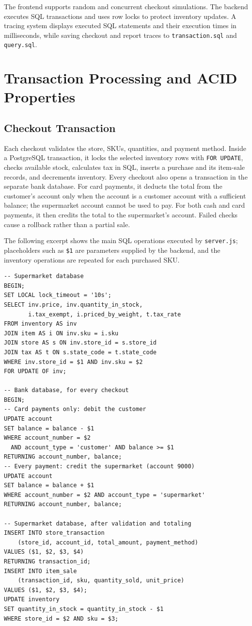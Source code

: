 \documentclass[11pt,letterpaper]{article}
\begin{document}
The frontend supports random and concurrent checkout simulations. The backend executes SQL transactions and uses row locks to protect inventory updates. A tracing system displays executed SQL statements and their execution times in milliseconds, while saving checkout and report traces to \texttt{transaction.sql} and \texttt{query.sql}.


\section{Transaction Processing and ACID Properties}

\subsection{Checkout Transaction}

Each checkout validates the store, SKUs, quantities, and payment method. Inside a PostgreSQL transaction, it locks the selected inventory rows with \texttt{FOR UPDATE}, checks available stock, calculates tax in SQL, inserts a purchase and its item-sale records, and decrements inventory. Every checkout also opens a transaction in the separate bank database. For card payments, it deducts the total from the customer's account only when the account is a customer account with a sufficient balance; the supermarket account cannot be used to pay. For both cash and card payments, it then credits the total to the supermarket's account. Failed checks cause a rollback rather than a partial sale.

The following excerpt shows the main SQL operations executed by \texttt{server.js}; placeholders such as \texttt{\$1} are parameters supplied by the backend, and the inventory operations are repeated for each purchased SKU.

\begin{lstlisting}
-- Supermarket database
BEGIN;
SET LOCAL lock_timeout = '10s';
SELECT inv.price, inv.quantity_in_stock,
       i.tax_exempt, i.priced_by_weight, t.tax_rate
FROM inventory AS inv
JOIN item AS i ON inv.sku = i.sku
JOIN store AS s ON inv.store_id = s.store_id
JOIN tax AS t ON s.state_code = t.state_code
WHERE inv.store_id = $1 AND inv.sku = $2
FOR UPDATE OF inv;

-- Bank database, for every checkout
BEGIN;
-- Card payments only: debit the customer
UPDATE account
SET balance = balance - $1
WHERE account_number = $2
  AND account_type = 'customer' AND balance >= $1
RETURNING account_number, balance;
-- Every payment: credit the supermarket (account 9000)
UPDATE account
SET balance = balance + $1
WHERE account_number = $2 AND account_type = 'supermarket'
RETURNING account_number, balance;

-- Supermarket database, after validation and totaling
INSERT INTO store_transaction
    (store_id, account_id, total_amount, payment_method)
VALUES ($1, $2, $3, $4)
RETURNING transaction_id;
INSERT INTO item_sale
    (transaction_id, sku, quantity_sold, unit_price)
VALUES ($1, $2, $3, $4);
UPDATE inventory
SET quantity_in_stock = quantity_in_stock - $1
WHERE store_id = $2 AND sku = $3;
\end{lstlisting}
\end{document}
